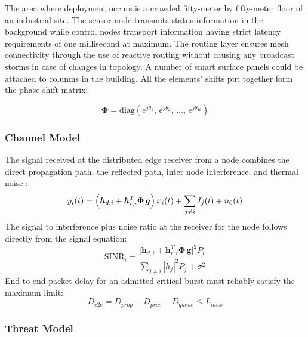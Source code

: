 \documentclass[a4paper,fleqn]{cas-dc}
\numberwithin{equation}{section}
\begin{document}
The area where deployment occurs is a crowded fifty-meter by fifty-meter floor of an industrial site. The sensor node transmits status information in the background while control nodes transport information having strict latency requirements of one millisecond at maximum. The routing layer ensures mesh connectivity through the use of reactive routing without causing any broadcast storms in case of changes in topology. A number of smart surface panels could be attached to columns in the building. All the elements’ shifts put together form the phase shift matrix:

\begin{equation}
\label{eq:ris_matrix}
\boldsymbol{\Phi} = \text{diag}\!\left(e^{j\theta_1},\, e^{j\theta_2},\, \dots,\, e^{j\theta_K}\right)
\end{equation}

\subsubsection*{Channel Model}

The signal received at the distributed edge receiver from a node combines the direct propagation path, the reflected path, inter node interference, and thermal noise \cite{b4}:
\begin{equation}
\label{eq:received_signal}
y_i(t) = \Bigl(\boldsymbol{h}_{d,i} + \boldsymbol{h}_{r,i}^{T}\boldsymbol{\Phi}\,\boldsymbol{g}\Bigr)\,x_i(t) + \sum_{j \neq i} I_j(t) + n_0(t)
\end{equation}
The signal to interference plus noise ratio at the receiver for the node follows directly from the signal equation:
\begin{equation}
\label{eq:sinr}
\text{SINR}_i = \frac{\bigl|\boldsymbol{h}_{d,i} + \boldsymbol{h}_{r,i}^{T}\boldsymbol{\Phi}\,\boldsymbol{g}\bigr|^2 P_i}{\displaystyle\sum_{j \neq i}\left|h_j\right|^2 P_j + \sigma^2}
\end{equation}
End to end packet delay for an admitted critical burst must reliably satisfy the maximum limit:
\begin{equation}
\label{eq:latency}
D_{e2e} = D_{prop} + D_{proc} + D_{queue} \leq L_{max}
\end{equation}

\subsubsection*{Threat Model}
\end{document}
